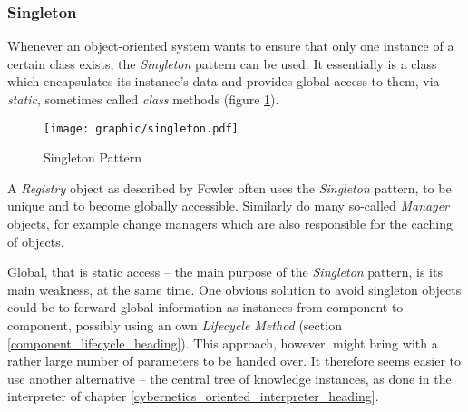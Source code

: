 %
%
%
%
%
%
%

\subsubsection{Singleton}
\label{singleton_heading}

Whenever an object-oriented system wants to ensure that only one instance of a
certain class exists, the \emph{Singleton} pattern \cite{gamma1995} can be
used. It essentially is a class which encapsulates its instance's data and
provides global access to them, via \emph{static}, sometimes called
\emph{class} methods (figure \ref{singleton_figure}).

\begin{figure}[ht]
    \begin{center}
        \texttt{[image: graphic/singleton.pdf]}
        \caption{Singleton Pattern}
        \label{singleton_figure}
    \end{center}
\end{figure}

A \emph{Registry} object as described by Fowler \cite{fowler2002} often uses
the \emph{Singleton} pattern, to be unique and to become globally accessible.
Similarly do many so-called \emph{Manager} objects, for example change managers
which are also responsible for the caching of objects.

Global, that is static access -- the main purpose of the \emph{Singleton}
pattern, is its main weakness, at the same time. One obvious solution to avoid
singleton objects could be to forward global information as instances from
component to component, possibly using an own \emph{Lifecycle Method} (section
\ref{component_lifecycle_heading}). This approach, however, might bring with a
rather large number of parameters to be handed over. It therefore seems easier
to use another alternative -- the central tree of knowledge instances, as done
in the interpreter of chapter \ref{cybernetics_oriented_interpreter_heading}.
